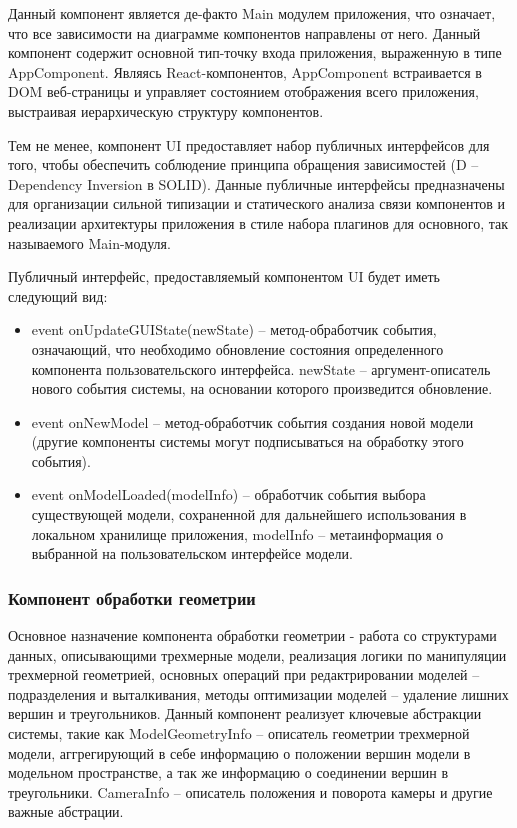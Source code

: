 Данный компонент является де-факто Main модулем приложения, что означает, что все зависимости на диаграмме компонентов направлены от него. Данный компонент содержит основной тип-точку входа
приложения, выраженную в типе AppComponent. Являясь React-компонентов, AppComponent встраивается в DOM веб-страницы и управляет состоянием отображения всего приложения, выстраивая иерархическую структуру
компонентов.

Тем не менее, компонент UI предоставляет набор публичных интерфейсов для того, чтобы обеспечить соблюдение принципа обращения зависимостей (D -- Dependency Inversion в SOLID\cite{solid}).
Данные публичные интерфейсы предназначены для организации сильной типизации и статического анализа связи компонентов и реализации архитектуры приложения в стиле набора плагинов для основного,
так называемого Main-модуля.

Публичный интерфейс, предоставляемый компонентом UI будет иметь следующий вид:
\begin{itemize}
\item event onUpdateGUIState(newState) -- метод-обработчик события, означающий, что необходимо обновление состояния определенного компонента пользовательского
интерфейса. newState -- аргумент-описатель нового события системы, на основании которого произведится обновление.
\item event onNewModel -- метод-обработчик события создания новой модели (другие компоненты системы могут подписываться на обработку этого события).
\item event onModelLoaded(modelInfo) -- обработчик события выбора существующей модели, сохраненной для дальнейшего использования в локальном хранилище приложения, modelInfo --
метаинформация о выбранной на пользовательском интерфейсе модели.
\end{itemize}


\subsubsection{Компонент обработки геометрии}
\label{sub:theory:components:geometry}

Основное назначение компонента обработки геометрии - работа со структурами данных, описывающими трехмерные модели, реализация логики по манипуляции трехмерной геометрией,
основных операций при редактрировании моделей -- подразделения и выталкивания, методы оптимизации моделей -- удаление лишних вершин и треугольников.
Данный компонент реализует ключевые абстракции системы, такие как ModelGeometryInfo -- описатель геометрии трехмерной модели, аггрегирующий в себе информацию о положении вершин модели
в модельном пространстве, а так же информацию о соединении вершин в треугольники. CameraInfo -- описатель положения и поворота камеры и другие важные абстрации.

